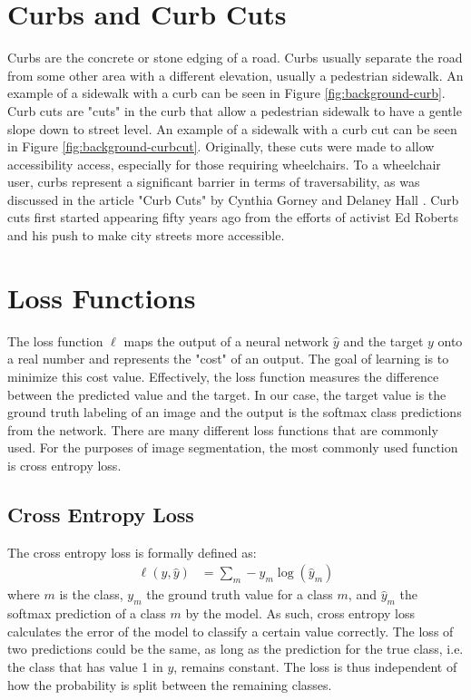 \section{Curbs and Curb Cuts}\label{section:background-curbs}
Curbs are the concrete or stone edging of a road. Curbs usually separate the road from some other area with a different elevation, usually a pedestrian sidewalk.
An example of a sidewalk with a curb can be seen in Figure \ref{fig:background-curb}.
Curb cuts are "cuts" in the curb that allow a pedestrian sidewalk to have a gentle slope down to street level.
An example of a sidewalk with a curb cut can be seen in Figure \ref{fig:background-curbcut}.
Originally, these cuts were made to allow accessibility access, especially for those requiring wheelchairs.
To a wheelchair user, curbs represent a significant barrier in terms of traversability, as was discussed in the article "Curb Cuts" by Cynthia Gorney and Delaney Hall \cite{99pi}. Curb cuts first started appearing fifty years ago from the efforts of activist Ed Roberts and his push to make city streets more accessible.



\section{Loss Functions}\label{section:background-loss}
The loss function $\ell$ maps the output of a neural network $\hat{y}$ and the target $y$ onto a real number and represents the "cost" of an output.
The goal of learning is to minimize this cost value.
Effectively, the loss function measures the difference between the predicted value and the target.
In our case, the target value is the ground truth labeling of an image and the output is the softmax class predictions from the network.
There are many different loss functions that are commonly used. For the purposes of image segmentation, the most commonly used function is cross entropy loss.

\subsection{Cross Entropy Loss}\label{section:background-crossentropy}
The cross entropy loss is formally defined as:
\begin{align}
	\ell(y, \hat{y}) &=\sum_{m}-y_m\log(\hat{y}_m)
\end{align}
where $m$ is the class, $y_m$ the ground truth value for a class $m$, and $\hat{y}_m$ the softmax prediction of a class $m$ by the model. 
As such, cross entropy loss calculates the error of the model to classify a certain value correctly.
The loss of two predictions could be the same, as long as the prediction for the true class, i.e. the class that has value 1 in $y$, remains constant.
The loss is thus independent of how the probability is split between the remaining classes.

